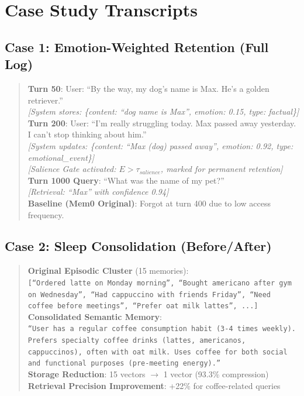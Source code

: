 \section{Case Study Transcripts}
\label{app:case_studies}

\subsection{Case 1: Emotion-Weighted Retention (Full Log)}
\begin{quote}
\small
\textbf{Turn 50}: User: ``By the way, my dog's name is Max. He's a golden retriever.''\\
\textit{[System stores: \{content: ``dog name is Max'', emotion: 0.15, type: factual\}]}\\[0.5em]
\textbf{Turn 200}: User: ``I'm really struggling today. Max passed away yesterday. I can't stop thinking about him.''\\
\textit{[System updates: \{content: ``Max (dog) passed away'', emotion: 0.92, type: emotional\_event\}]}\\
\textit{[Salience Gate activated: $E > \tau_{salience}$, marked for permanent retention]}\\[0.5em]
\textbf{Turn 1000 Query}: ``What was the name of my pet?''\\
\textit{[Retrieval: ``Max'' with confidence 0.94]}\\
\textbf{Baseline (Mem0 Original)}: Forgot at turn 400 due to low access frequency.
\end{quote}

\subsection{Case 2: Sleep Consolidation (Before/After)}
\begin{quote}
\small
\textbf{Original Episodic Cluster} (15 memories):\\
\texttt{[``Ordered latte on Monday morning'', ``Bought americano after gym on Wednesday'', ``Had cappuccino with friends Friday'', ``Need coffee before meetings'', ``Prefer oat milk lattes'', ...]}\\[0.5em]
\textbf{Consolidated Semantic Memory}:\\
\texttt{``User has a regular coffee consumption habit (3-4 times weekly). Prefers specialty coffee drinks (lattes, americanos, cappuccinos), often with oat milk. Uses coffee for both social and functional purposes (pre-meeting energy).''}\\[0.5em]
\textbf{Storage Reduction}: 15 vectors $\rightarrow$ 1 vector (93.3\% compression)\\
\textbf{Retrieval Precision Improvement}: +22\% for coffee-related queries
\end{quote}

